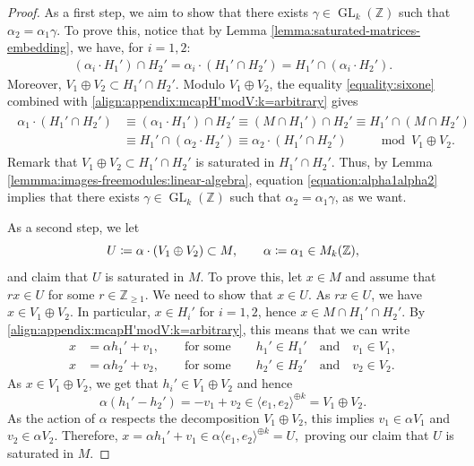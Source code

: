 \documentclass[a4paper,11pt,reqno]{amsart}
\numberwithin{equation}{section}
\theoremstyle{plain}
\theoremstyle{definition}
\newcommand{\Z}{\mathbb Z}
\let\rm\relax
\newcommand{\rm}[1]{{\mathrm{#1}}}
\newcommand{\GL}{\operatorname{GL}}
\begin{document}
\begin{proof}
As a first step, we aim to show that there exists $\gamma \in \GL_k(\Z)$ such that $\alpha_2 = \alpha_1 \gamma$. To prove this, notice that by Lemma \ref{lemma:saturated-matrices-embedding}, we have, for $i = 1,2$: 
\begin{align}\label{equality:sixone}
\left(\alpha_i \cdot H_1'\right) \cap H_2'
=\alpha_i \cdot \left( H_1' \cap H_2' \right) =
H_1'  \cap \left( \alpha_i \cdot H_2'\right). 
\end{align}
Moreover, $V_1 \oplus V_2 \subset H_1' \cap H_2'$. Modulo $V_1 \oplus V_2$, the equality \eqref{equality:sixone} combined with \eqref{align:appendix:mcapH'modV:k=arbitrary} gives 
\begin{align} \label{equation:alpha1alpha2}
\begin{split}
\alpha_1 \cdot \left( H_1' \cap H_2' \right) &\equiv \left(\alpha_1 \cdot H_1'\right) \cap H_2'  
\equiv \left( M \cap H_1'\right) \cap H_2' 
\equiv H_1'  \cap \left( M \cap H_2'\right) 
\\
 &\equiv H_1'  \cap \left( \alpha_2 \cdot H_2'\right)    \equiv \alpha_2 \cdot \left( H_1' \cap H_2' \right) \quad \quad  \mod V_1 \oplus V_2.  
\end{split}
\end{align}
Remark that $V_1 \oplus V_2 \subset H_1' \cap H_2'$ is saturated in $H_1' \cap H_2'$. Thus, by Lemma \ref{lemmma:images-freemodules:linear-algebra}, equation \eqref{equation:alpha1alpha2} implies that there exists $\gamma \in \GL_k(\Z)$ such that $\alpha_2 = \alpha_1\gamma$, as we want.

As a second step, we let
    $$
    U\coloneqq \alpha \cdot \left(V_1 \oplus V_2 \right) \subset M, \quad \quad \alpha \coloneqq \alpha_1 \in \rm{M}_k(\Z),
    $$
and claim that $U$ is saturated in $M$. To prove this, let $x \in M$ and assume that $rx \in U$ for some $r \in \Z_{\geq 1}$. We need to show that $x \in U$. As $rx \in U$, we have $x \in V_1 \oplus V_2$. In particular, $x \in H_i'$ for $i = 1,2$, hence $x \in M \cap  H_1' \cap H_2'$. By \eqref{align:appendix:mcapH'modV:k=arbitrary}, this means that we can write 
\begin{align*}
    x & = \alpha h_1' + v_1, \quad \quad \text{for some} \quad \quad h_1' \in H_1'\quad \text{and} \quad v_1 \in V_1, \\
    x & = \alpha h_2' + v_2, \quad \quad \text{for some} \quad \quad h_2' \in H_2' \quad \text{and} \quad v_2 \in V_2.
\end{align*}
As $x \in V_1 \oplus V_2$, we get that $h_i' \in V_1 \oplus V_2$ and hence 
$$
\alpha(h_1' - h_2') =  -v_1 + v_2 \in  \langle e_1, e_2 \rangle^{\oplus k}=V_1 \oplus V_2.
$$
As the action of $\alpha$ respects the decomposition $ V_1 \oplus V_2$, this implies $v_1 \in \alpha V_1$ and $v_2 \in \alpha V_2$. Therefore, 
$
x  = \alpha h_1' + v_1 \in \alpha \langle e_1, e_2 \rangle^{\oplus k} = U,
$
proving our claim that $U$ is saturated in $M$. 


\end{proof}
\end{document}

